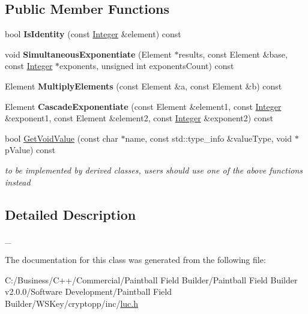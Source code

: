 \subsection*{Public Member Functions}
\begin{DoxyCompactItemize}
\item 
\hypertarget{class_d_l___group_parameters___l_u_c_a850f7fd1cf579fb80ee10334db411b0a}{
bool {\bfseries IsIdentity} (const \hyperlink{class_integer}{Integer} \&element) const }
\label{class_d_l___group_parameters___l_u_c_a850f7fd1cf579fb80ee10334db411b0a}

\item 
\hypertarget{class_d_l___group_parameters___l_u_c_a21a11871ed32c03b08cc9821fae71145}{
void {\bfseries SimultaneousExponentiate} (Element $\ast$results, const Element \&base, const \hyperlink{class_integer}{Integer} $\ast$exponents, unsigned int exponentsCount) const }
\label{class_d_l___group_parameters___l_u_c_a21a11871ed32c03b08cc9821fae71145}

\item 
\hypertarget{class_d_l___group_parameters___l_u_c_a9df2fb81258ef1c965049212f72dfaee}{
Element {\bfseries MultiplyElements} (const Element \&a, const Element \&b) const }
\label{class_d_l___group_parameters___l_u_c_a9df2fb81258ef1c965049212f72dfaee}

\item 
\hypertarget{class_d_l___group_parameters___l_u_c_aab12075f368af85622792fa3c03515f2}{
Element {\bfseries CascadeExponentiate} (const Element \&element1, const \hyperlink{class_integer}{Integer} \&exponent1, const Element \&element2, const \hyperlink{class_integer}{Integer} \&exponent2) const }
\label{class_d_l___group_parameters___l_u_c_aab12075f368af85622792fa3c03515f2}

\item 
\hypertarget{class_d_l___group_parameters___l_u_c_a1fe69d1b816aafccc929ac5f17148330}{
bool \hyperlink{class_d_l___group_parameters___l_u_c_a1fe69d1b816aafccc929ac5f17148330}{GetVoidValue} (const char $\ast$name, const std::type\_\-info \&valueType, void $\ast$pValue) const }
\label{class_d_l___group_parameters___l_u_c_a1fe69d1b816aafccc929ac5f17148330}

\begin{DoxyCompactList}\small\item\em to be implemented by derived classes, users should use one of the above functions instead \item\end{DoxyCompactList}\end{DoxyCompactItemize}


\subsection{Detailed Description}
\_\- 

The documentation for this class was generated from the following file:\begin{DoxyCompactItemize}
\item 
C:/Business/C++/Commercial/Paintball Field Builder/Paintball Field Builder v2.0.0/Software Development/Paintball Field Builder/WSKey/cryptopp/inc/\hyperlink{luc_8h}{luc.h}\end{DoxyCompactItemize}
